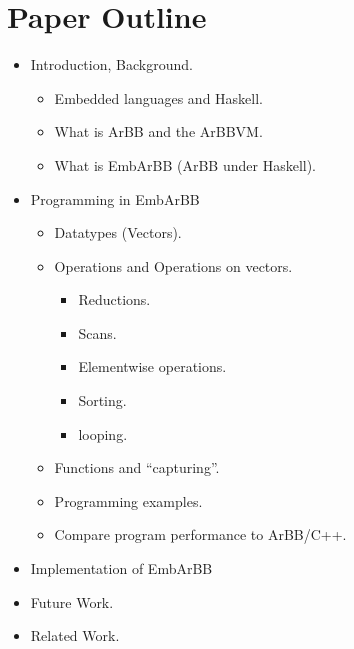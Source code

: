 
\section{Paper Outline} 

\begin{itemize} 
  \item Introduction, Background. 
    \begin{itemize} 
      \item Embedded languages and Haskell. 
      \item What is ArBB and the ArBBVM. 
      \item What is EmbArBB (ArBB under Haskell).
    \end{itemize}
  \item Programming in EmbArBB 
    \begin{itemize} 
      \item Datatypes (Vectors).
      \item Operations and Operations on vectors.
        \begin{itemize} 
          \item Reductions.
          \item Scans. 
          \item Elementwise operations.
          \item Sorting. 
          \item looping. 
        \end {itemize}
      \item Functions and ``capturing''.
      \item Programming examples.
      \item Compare program performance to ArBB/C++.
    \end{itemize}
  \item Implementation of EmbArBB 
  \item Future Work.
  \item Related Work.
\end{itemize}

 
